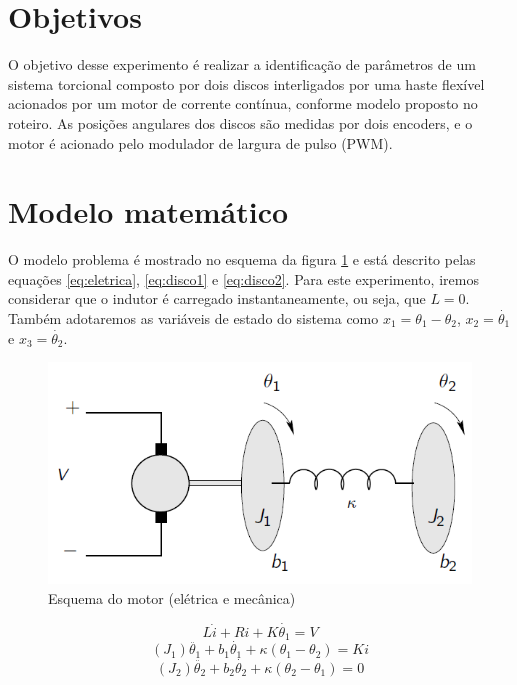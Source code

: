\documentclass{article}
\begin{document}


\onehalfspacing
\section{Objetivos} 
O objetivo desse experimento é realizar a identificação de parâmetros de um sistema torcional composto por dois discos interligados por uma haste flexível acionados por um motor de corrente contínua, conforme modelo proposto no roteiro\cite{bb:roteiro}. As posições angulares dos discos são medidas por dois encoders, e o motor é acionado pelo modulador de largura de pulso (PWM).
	
\section{Modelo matemático}
O modelo problema é mostrado no esquema da figura \ref{fig:esqmotor} e está descrito pelas equações \ref{eq:eletrica}, \ref{eq:disco1} e \ref{eq:disco2}. Para este experimento, iremos considerar que o indutor é carregado instantaneamente, ou seja, que $L=0$. Também adotaremos as variáveis de estado do sistema como $x_1=\theta_1-\theta_2$, $x_2=\dot{\theta_1}$ e $x_3=\dot{\theta_2}$.

\begin{figure}[H]
	\centering
	\includegraphics[width=0.8\linewidth]{esqmotor}
	\caption{Esquema do motor (elétrica e mecânica)}
	\label{fig:esqmotor}
\end{figure}

\begin{equation}
\label{eq:eletrica}
L\dot{i}+Ri+K\dot{\theta_1}=V
\end{equation}
\begin{equation}
\label{eq:disco1}
(J_1)\ddot{\theta_1}+b_1\dot{\theta_1}+\kappa(\theta_1-\theta_2)=Ki
\end{equation}
\begin{equation}
\label{eq:disco2}
(J_2)\ddot{\theta_2}+b_2\dot{\theta_2}+\kappa(\theta_2-\theta_1)=0
\end{equation}
\end{document}
